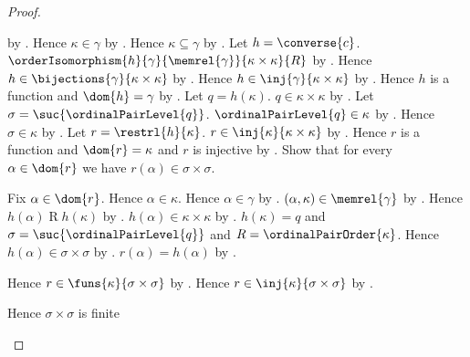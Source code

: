 \begin{proof}
\begin{subproof}
            by .
        Hence $\kappa\in\gamma$ by .
        Hence $\kappa\subseteq\gamma$
            by .
        Let $h=\converse{c}$.
        $\orderIsomorphism{h}{\gamma}{\memrel{\gamma}}
            {\kappa\times\kappa}{R}$
            by .
        Hence $h\in\bijections{\gamma}{\kappa\times\kappa}$
            by .
        Hence $h\in\inj{\gamma}{\kappa\times\kappa}$
            by .
        Hence $h$ is a function and $\dom{h}=\gamma$
            by .
        Let $q=h(\kappa)$.
        $q\in\kappa\times\kappa$ by .
        Let $\sigma=\suc{\ordinalPairLevel{q}}$.
        $\ordinalPairLevel{q}\in\kappa$
            by .
        Hence $\sigma\in\kappa$ by .
        Let $r=\restrl{h}{\kappa}$.
        $r\in\inj{\kappa}{\kappa\times\kappa}$
            by .
        Hence $r$ is a function and $\dom{r}=\kappa$ and
            $r$ is injective
            by .
        Show that for every $\alpha\in\dom{r}$ we have
            $r(\alpha)\in\sigma\times\sigma$.
        \begin{subproof}
            Fix $\alpha\in\dom{r}$.
            Hence $\alpha\in\kappa$.
            Hence $\alpha\in\gamma$ by .
            $(\alpha,\kappa)\in\memrel{\gamma}$
                by .
            Hence $h(\alpha)\mathrel{R}h(\kappa)$
                by .
            $h(\alpha)\in\kappa\times\kappa$
                by .
            $h(\kappa)=q$ and
                $\sigma=\suc{\ordinalPairLevel{q}}$ and
                $R=\ordinalPairOrder{\kappa}$.
            Hence $h(\alpha)\in\sigma\times\sigma$
                by .
            $r(\alpha)=h(\alpha)$
                by .
        \end{subproof}
        Hence $r\in\funs{\kappa}{\sigma\times\sigma}$
            by .
        Hence $r\in\inj{\kappa}{\sigma\times\sigma}$
            by .
        \begin{byCase}
                Hence $\sigma\times\sigma$ is finite

\end{byCase}
\end{subproof}
\end{proof}
